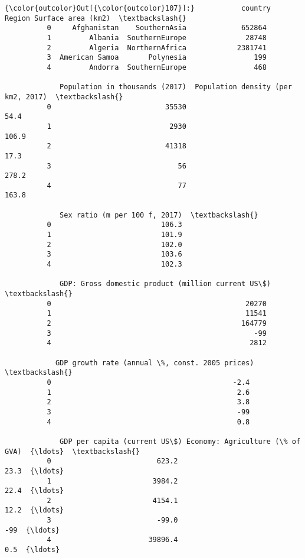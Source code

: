 \documentclass[11pt]{article}
\begin{document}
\begin{Verbatim}[commandchars=\\\{\}]
{\color{outcolor}Out[{\color{outcolor}107}]:}           country          Region Surface area (km2)  \textbackslash{}
          0     Afghanistan    SouthernAsia             652864   
          1         Albania  SouthernEurope              28748   
          2         Algeria  NorthernAfrica            2381741   
          3  American Samoa       Polynesia                199   
          4         Andorra  SouthernEurope                468   
          
             Population in thousands (2017)  Population density (per km2, 2017)  \textbackslash{}
          0                           35530                                54.4   
          1                            2930                               106.9   
          2                           41318                                17.3   
          3                              56                               278.2   
          4                              77                               163.8   
          
             Sex ratio (m per 100 f, 2017)  \textbackslash{}
          0                          106.3   
          1                          101.9   
          2                          102.0   
          3                          103.6   
          4                          102.3   
          
             GDP: Gross domestic product (million current US\$)  \textbackslash{}
          0                                              20270   
          1                                              11541   
          2                                             164779   
          3                                                -99   
          4                                               2812   
          
            GDP growth rate (annual \%, const. 2005 prices)  \textbackslash{}
          0                                           -2.4   
          1                                            2.6   
          2                                            3.8   
          3                                            -99   
          4                                            0.8   
          
             GDP per capita (current US\$) Economy: Agriculture (\% of GVA)  {\ldots}  \textbackslash{}
          0                         623.2                            23.3  {\ldots}   
          1                        3984.2                            22.4  {\ldots}   
          2                        4154.1                            12.2  {\ldots}   
          3                         -99.0                             -99  {\ldots}   
          4                       39896.4                             0.5  {\ldots}   
          

\end{Verbatim}
\end{document}
